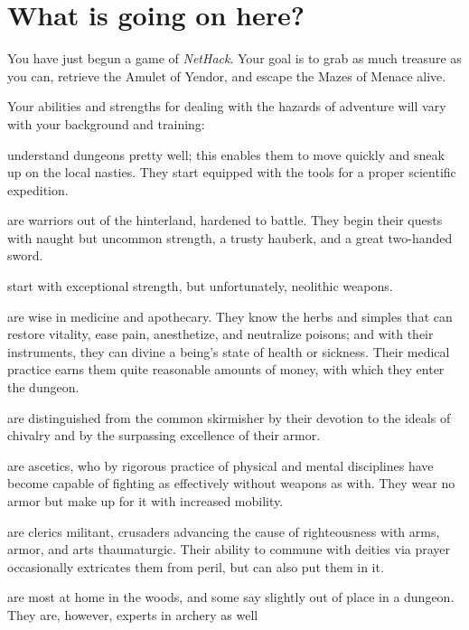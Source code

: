 \section{What is going on here?}

You have just begun a game of {\it NetHack}.  Your goal is to grab as much
treasure as you can, retrieve the Amulet of Yendor, and escape the
Mazes of Menace alive.

Your abilities and strengths for dealing with the hazards of adventure
will vary with your background and training:

%
\blist{}
\item[\bb{Archeologists}]%
understand dungeons pretty well; this enables them
to move quickly and sneak up on the local nasties.  They start equipped
with the tools for a proper scientific expedition.
%
\item[\bb{Barbarians}]%
are warriors out of the hinterland, hardened to battle.
They begin their quests with naught but uncommon strength, a trusty hauberk,
and a great two-handed sword.
%
\item[\bb{Cavemen {\rm and} Cavewomen}]
start with exceptional strength, but unfortunately, neolithic weapons.
%
\item[\bb{Healers}]%
are wise in medicine and apothecary.  They know the
herbs and simples that can restore vitality, ease pain, anesthetize,
and neutralize
poisons; and with their instruments, they can divine a being's state
of health or sickness.  Their medical practice earns them quite reasonable
amounts of money, with which they enter the dungeon.
%
\item[\bb{Knights}]%
are distinguished from the common skirmisher by their
devotion to the ideals of chivalry and by the surpassing excellence of
their armor.
%
\item[\bb{Monks}]%
are ascetics, who by rigorous practice of physical and mental
disciplines have become capable of fighting as effectively without weapons
as with.  They wear no armor but make up for it with increased mobility.
%
\item[\bb{Priests {\rm and} Priestesses}]%
are clerics militant, crusaders
advancing the cause of righteousness with arms, armor, and arts
thaumaturgic.  Their ability to commune with deities via prayer
occasionally extricates them from peril, but can also put them in it.
%
\item[\bb{Rangers}]%
are most at home in the woods, and some say slightly out
of place in a dungeon.  They are, however, experts in archery as well
